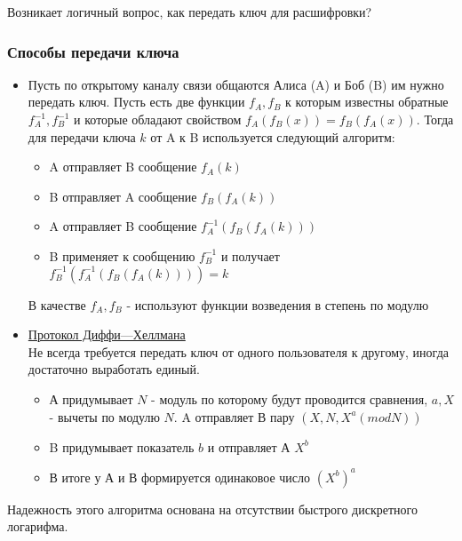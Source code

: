 Возникает логичный вопрос, как передать ключ для расшифровки? \\

\subsubsection{Способы передачи ключа}

\begin {itemize}
\item Пусть по открытому каналу связи общаются Алиса (A) и Боб (B) им нужно передать ключ. Пусть есть две функции $f_{A}, f_{B}$ к которым известны обратные $f^{-1}_{A}, f^{-1}_{B}$ и которые обладают свойством $f_{A} (f_{B} (x)) = f_{B} (f_{A} (x))$. Тогда для передачи ключа $k$ от A к B используется следующий алгоритм:
\begin {itemize}
\item A отправляет B сообщение $f_{A} (k)$ 
\item B отправляет A сообщение $f_{B}(f_{A} (k))$
\item A отправляет B сообщение $f^{-1}_{A}(f_{B}(f_{A} (k)))$
\item B применяет к сообщению $f^{-1}_{B}$ и получает $f^{-1}_{B}(f^{-1}_{A}(f_{B}(f_{A} (k)))) = k$
\end {itemize}
В качестве $f_{A}, f_{B}$ - используют функции возведения в степень по модулю \\

\item \href{https://ru.wikipedia.org/wiki/Протокол_Диффи_—_Хеллмана} {Протокол Диффи—Хеллмана}\\
Не всегда требуется передать ключ от одного пользователя к другому, иногда достаточно выработать единый. 
\begin {itemize}
\item А придумывает $N$ - модуль по которому будут проводится сравнения, $a, X$ - вычеты по модулю $N$. A отправляет В пару $(X, N, X^{a} (mod N))$
\item B придумывает показатель $b$ и отправляет А $X^{b}$
\item В итоге у А и В формируется одинаковое число $\left( X^{b} \right)^{a}$
\end {itemize}
\end{itemize}
Надежность этого алгоритма основана на отсутствии быстрого дискретного логарифма.

